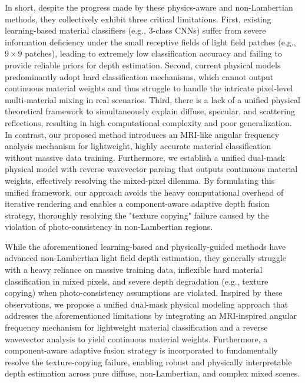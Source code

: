 In short, despite the progress made by these physics-aware and non-Lambertian methods, they collectively exhibit three critical limitations. First, existing learning-based material classifiers (e.g., 3-class CNNs) suffer from severe information deficiency under the small receptive fields of light field patches (e.g., $9 \times 9$ patches), leading to extremely low classification accuracy and failing to provide reliable priors for depth estimation. Second, current physical models predominantly adopt hard classification mechanisms, which cannot output continuous material weights and thus struggle to handle the intricate pixel-level multi-material mixing in real scenarios. Third, there is a lack of a unified physical theoretical framework to simultaneously explain diffuse, specular, and scattering reflections, resulting in high computational complexity and poor generalization. In contrast, our proposed method introduces an MRI-like angular frequency analysis mechanism for lightweight, highly accurate material classification without massive data training. Furthermore, we establish a unified dual-mask physical model with reverse wavevector parsing that outputs continuous material weights, effectively resolving the mixed-pixel dilemma. By formulating this unified framework, our approach avoids the heavy computational overhead of iterative rendering and enables a component-aware adaptive depth fusion strategy, thoroughly resolving the "texture copying" failure caused by the violation of photo-consistency in non-Lambertian regions.

While the aforementioned learning-based and physically-guided methods have advanced non-Lambertian light field depth estimation, they generally struggle with a heavy reliance on massive training data, inflexible hard material classification in mixed pixels, and severe depth degradation (e.g., texture copying) when photo-consistency assumptions are violated. Inspired by these observations, we propose a unified dual-mask physical modeling approach that addresses the aforementioned limitations by integrating an MRI-inspired angular frequency mechanism for lightweight material classification and a reverse wavevector analysis to yield continuous material weights. Furthermore, a component-aware adaptive fusion strategy is incorporated to fundamentally resolve the texture-copying failure, enabling robust and physically interpretable depth estimation across pure diffuse, non-Lambertian, and complex mixed scenes.